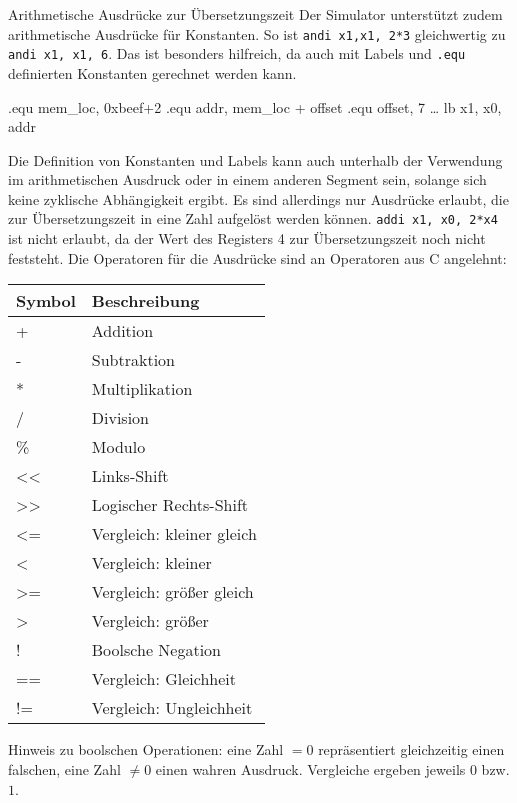\begin{infoblock}{Arithmetische Ausdrücke zur Übersetzungszeit}
	Der Simulator unterstützt zudem arithmetische Ausdrücke für Konstanten. So ist \texttt{andi x1,x1, 2*3} gleichwertig zu \texttt{andi x1, x1, 6}. Das ist besonders hilfreich, da auch mit Labels und \texttt{.equ} definierten Konstanten gerechnet werden kann.\\
	\begin{riscv}
		.equ mem_loc, 0xbeef+2
		.equ addr, mem_loc + offset
		.equ offset, 7
		\dots
		lb x1, x0, addr
	\end{riscv}

  Die Definition von Konstanten und Labels kann auch unterhalb der Verwendung im
  arithmetischen Ausdruck oder in einem anderen Segment sein, solange sich keine
  zyklische Abhängigkeit ergibt. Es sind allerdings nur Ausdrücke erlaubt, die
  zur Übersetzungszeit in eine Zahl aufgelöst werden können. \texttt{addi x1,
  x0, 2*x4} ist nicht erlaubt, da der Wert des Registers 4 zur Übersetzungszeit
  noch nicht feststeht. Die Operatoren für die Ausdrücke sind an Operatoren aus
  C angelehnt:

	\begin{center}
    \begin{tabular}{ll}
      \textbf{Symbol} & \textbf{Beschreibung}\\
      \toprule
      + & Addition \\
      - & Subtraktion \\
      * & Multiplikation \\
      / & Division \\
      \% & Modulo \\
      << & Links-Shift\\
      >> & Logischer Rechts-Shift\\
      <= & Vergleich: kleiner gleich\\
      < & Vergleich: kleiner\\
      >= & Vergleich: größer gleich\\
      > & Vergleich: größer\\
      ! & Boolsche Negation\\
      == & Vergleich: Gleichheit\\
      != & Vergleich: Ungleichheit\\
    \end{tabular}
	\end{center}

	Hinweis zu boolschen Operationen: eine Zahl $=0$ repräsentiert gleichzeitig
	einen falschen, eine Zahl $\neq 0$ einen wahren Ausdruck. Vergleiche ergeben
	jeweils $0$ bzw. $1$.

\end{infoblock}

